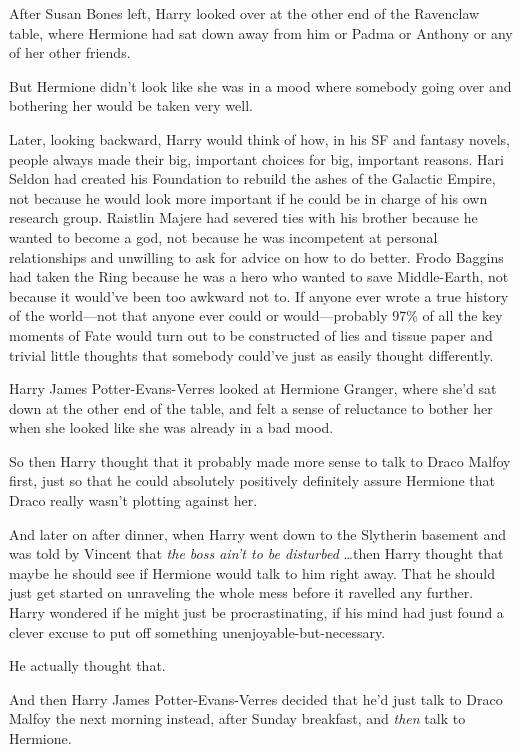 After Susan Bones left, Harry looked over at the other end of the Ravenclaw table, where Hermione had sat down away from him or Padma or Anthony or any of her other friends.

But Hermione didn't look like she was in a mood where somebody going over and bothering her would be taken very well.

Later, looking backward, Harry would think of how, in his SF and fantasy novels, people always made their big, important choices for big, important reasons. Hari Seldon had created his Foundation to rebuild the ashes of the Galactic Empire, not because he would look more important if he could be in charge of his own research group. Raistlin Majere had severed ties with his brother because he wanted to become a god, not because he was incompetent at personal relationships and unwilling to ask for advice on how to do better. Frodo Baggins had taken the Ring because he was a hero who wanted to save Middle-Earth, not because it would've been too awkward not to. If anyone ever wrote a true history of the world—not that anyone ever could or would—probably 97\% of all the key moments of Fate would turn out to be constructed of lies and tissue paper and trivial little thoughts that somebody could've just as easily thought differently.

Harry James Potter-Evans-Verres looked at Hermione Granger, where she'd sat down at the other end of the table, and felt a sense of reluctance to bother her when she looked like she was already in a bad mood.

So then Harry thought that it probably made more sense to talk to Draco Malfoy first, just so that he could absolutely positively definitely assure Hermione that Draco really wasn't plotting against her.

And later on after dinner, when Harry went down to the Slytherin basement and was told by Vincent that \emph{the boss ain't to be disturbed} {\ldots}then Harry thought that maybe he should see if Hermione would talk to him right away. That he should just get started on unraveling the whole mess before it ravelled any further. Harry wondered if he might just be procrastinating, if his mind had just found a clever excuse to put off something unenjoyable-but-necessary.

He actually thought that.

And then Harry James Potter-Evans-Verres decided that he'd just talk to Draco Malfoy the next morning instead, after Sunday breakfast, and \emph{then} talk to Hermione.

